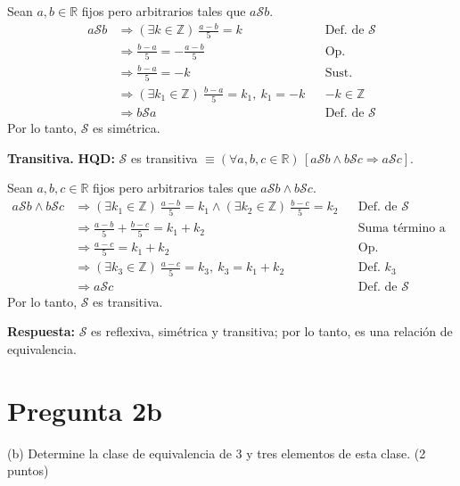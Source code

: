 \documentclass[11pt]{article}
\newcommand{\Sr}{\mathcal{S}}
\begin{document}
Sean $a,b\in\mathbb R$ fijos pero arbitrarios tales que $a\Sr b$.
\begin{align*}
a\Sr b&\Rightarrow(\exists k\in\mathbb Z)\ \frac{a-b}{5}=k && \text{Def. de } \Sr\\
&\Rightarrow \frac{b-a}{5}=-\frac{a-b}{5} && \text{Op.}\\
&\Rightarrow \frac{b-a}{5}=-k && \text{Sust.}\\
&\Rightarrow (\exists k_1\in\mathbb Z)\ \frac{b-a}{5}=k_1,\ k_1=-k && -k\in\mathbb Z\\
&\Rightarrow b\Sr a && \text{Def. de } \Sr
\end{align*}
Por lo tanto, $\Sr$ es simétrica.

\textbf{Transitiva.} \textbf{HQD:} $\Sr$ es transitiva $\equiv(\forall a,b,c\in\mathbb R)\,[a\Sr b\wedge b\Sr c\Rightarrow a\Sr c]$.

Sean $a,b,c\in\mathbb R$ fijos pero arbitrarios tales que $a\Sr b\wedge b\Sr c$.
\begin{align*}
a\Sr b\wedge b\Sr c&\Rightarrow(\exists k_1\in\mathbb Z)\ \frac{a-b}{5}=k_1\wedge(\exists k_2\in\mathbb Z)\ \frac{b-c}{5}=k_2 && \text{Def. de } \Sr\\
&\Rightarrow \frac{a-b}{5}+\frac{b-c}{5}=k_1+k_2 && \text{Suma término a término}\\
&\Rightarrow \frac{a-c}{5}=k_1+k_2 && \text{Op.}\\
&\Rightarrow (\exists k_3\in\mathbb Z)\ \frac{a-c}{5}=k_3,\ k_3=k_1+k_2 && \text{Def. } k_3\\
&\Rightarrow a\Sr c && \text{Def. de } \Sr
\end{align*}
Por lo tanto, $\Sr$ es transitiva.

\textbf{Respuesta:} $\Sr$ es reflexiva, simétrica y transitiva; por lo tanto, es una relación de equivalencia.

\clearpage
\section*{Pregunta 2b}

(b) Determine \colorbox{green!35}{la clase de equivalencia de 3} y \colorbox{green!35}{tres elementos} de esta clase. \hfill (2 puntos)
\end{document}
